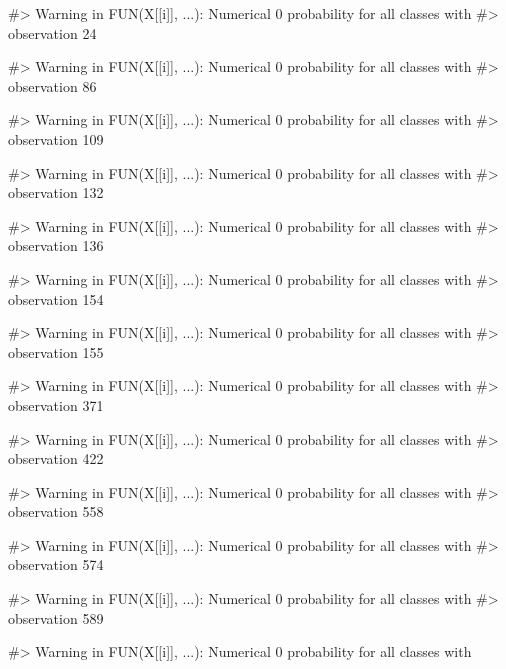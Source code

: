 \begin{Schunk}
\begin{Soutput}
#> Warning in FUN(X[[i]], ...): Numerical 0 probability for all classes with
#> observation 24
\end{Soutput}
\begin{Soutput}
#> Warning in FUN(X[[i]], ...): Numerical 0 probability for all classes with
#> observation 86
\end{Soutput}
\begin{Soutput}
#> Warning in FUN(X[[i]], ...): Numerical 0 probability for all classes with
#> observation 109
\end{Soutput}
\begin{Soutput}
#> Warning in FUN(X[[i]], ...): Numerical 0 probability for all classes with
#> observation 132
\end{Soutput}
\begin{Soutput}
#> Warning in FUN(X[[i]], ...): Numerical 0 probability for all classes with
#> observation 136
\end{Soutput}
\begin{Soutput}
#> Warning in FUN(X[[i]], ...): Numerical 0 probability for all classes with
#> observation 154
\end{Soutput}
\begin{Soutput}
#> Warning in FUN(X[[i]], ...): Numerical 0 probability for all classes with
#> observation 155
\end{Soutput}
\begin{Soutput}
#> Warning in FUN(X[[i]], ...): Numerical 0 probability for all classes with
#> observation 371
\end{Soutput}
\begin{Soutput}
#> Warning in FUN(X[[i]], ...): Numerical 0 probability for all classes with
#> observation 422
\end{Soutput}
\begin{Soutput}
#> Warning in FUN(X[[i]], ...): Numerical 0 probability for all classes with
#> observation 558
\end{Soutput}
\begin{Soutput}
#> Warning in FUN(X[[i]], ...): Numerical 0 probability for all classes with
#> observation 574
\end{Soutput}
\begin{Soutput}
#> Warning in FUN(X[[i]], ...): Numerical 0 probability for all classes with
#> observation 589
\end{Soutput}
\begin{Soutput}
#> Warning in FUN(X[[i]], ...): Numerical 0 probability for all classes with

\end{Soutput}
\end{Schunk}
